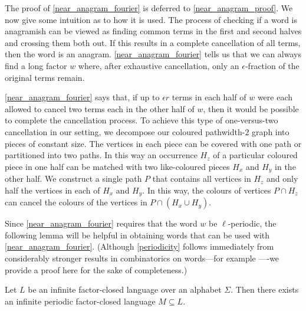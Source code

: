 \documentclass{patmorin}
\begin{document}
The proof of \cref{near_anagram_fourier} is deferred to \cref{near_anagram_proof}.  We now give some intuition as to how it is used.  The process of checking if a word is anagramish can be viewed as finding common terms in the first and second halves and crossing them both out.  If this results in a complete cancellation of all terms, then the word is an anagram.  \cref{near_anagram_fourier} tells us that we can always find a long factor $w$ where, after exhaustive cancellation, only an $\epsilon$-fraction of the original terms remain.

\cref{near_anagram_fourier} says that, if up to $\epsilon r$ terms in each half of $w$ were each allowed to cancel two terms each in the other half of $w$, then it would be possible to complete the cancellation process.  To achieve this type of one-versus-two cancellation in our setting, we decompose our coloured pathwidth-$2$ graph into pieces of constant size.  The vertices in each piece can be covered with one path or partitioned into two paths.  In this way an occurrence $H_z$ of a particular coloured piece in one half can be matched with two like-coloured pieces $H_x$ and $H_y$ in the other half. We construct a single path $P$ that contains all vertices in $H_z$ and only half the vertices in each of $H_x$ and $H_y$.  In this way, the colours of vertices $P\cap H_z$ can cancel the colours of the vertices in $P\cap(H_x\cup H_y)$.

Since \cref{near_anagram_fourier} requires that the word $w$ be $\ell$-periodic, the following lemma will be helpful in obtaining words that can be used with \cref{near_anagram_fourier}. (Although \cref{periodicity} follows immediately from considerably stronger results in combinatorics on words---for example \citet[Proposition~1.5.12]{lothaire:algebraic}----we provide a proof here for the sake of completeness.)


\begin{lem}\label{periodicity}
    Let $L$ be an infinite factor-closed language over an alphabet $\Sigma$.  Then there exists an infinite periodic factor-closed language $M\subseteq L$.
\end{lem}
\end{document}

